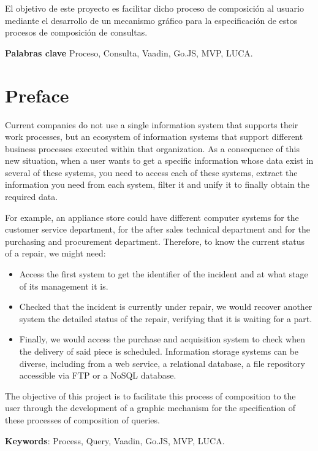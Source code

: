 	
	El objetivo de este proyecto es facilitar dicho proceso de composición al usuario mediante el desarrollo de un mecanismo gráfico para la especificación de estos procesos de composición de consultas.

	
 \textbf{Palabras clave}
 Proceso, Consulta, Vaadin, Go.JS, MVP, LUCA.
	
\chapter*{Preface}

	Current companies do not use a single information system that supports their work processes, but an ecosystem of information systems that support different business processes executed within that organization. As a consequence of this new situation, when a user wants to get a specific information whose data exist in several of these
	systems, you need to access each of these systems, extract the information you need from each system, filter it and unify it to finally obtain the required data.
	
	
	For example, an appliance store could have different computer systems for the customer service department, for the after sales technical department and for the purchasing and procurement department. Therefore, to know the current status of a repair, we might need:
	\begin{itemize}
		\item Access the first system to get the identifier of the incident and at what stage of its management it is.
		\item Checked that the incident is currently under repair, we would recover another system the detailed status of the repair, verifying that it is waiting for a part.
		\item Finally, we would access the purchase and acquisition system to check when the delivery of said piece is scheduled. Information storage systems can be diverse, including from a web service, a relational database, a file repository accessible via FTP or a NoSQL database.
	\end{itemize}


	The objective of this project is to facilitate this process of composition to the user through the development of a graphic mechanism for the specification of these processes of composition of queries.
	

	\textbf{Keywords}:
	Process, Query, Vaadin, Go.JS, MVP, LUCA.